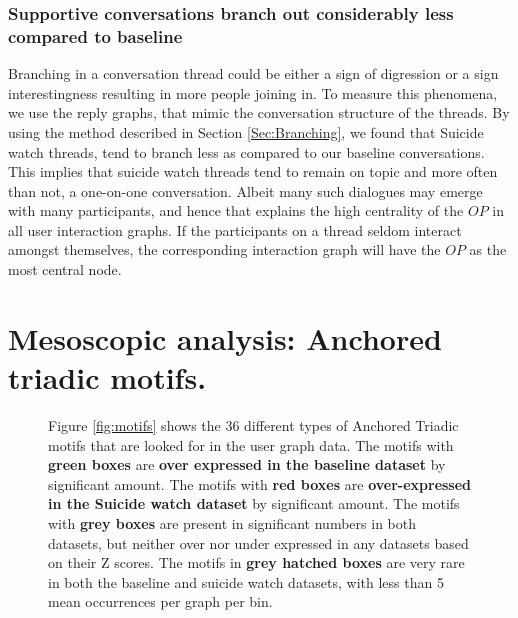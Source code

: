 \subsubsection{Supportive conversations branch out considerably less compared to baseline}
Branching in a conversation thread could be either a sign of digression or a sign interestingness resulting in more people joining in. To measure this phenomena, we use the reply graphs, that mimic the conversation structure of the threads. By using the method described in Section \ref{Sec:Branching}, we found that Suicide watch threads, tend to branch less as compared to our baseline conversations. This implies that suicide watch threads tend to remain on topic and more often than not, a one-on-one conversation. Albeit many such dialogues may emerge with many participants, and hence that explains the high centrality of the $OP$ in all user interaction graphs. If the participants on a thread seldom interact amongst themselves, the corresponding interaction graph will have the $OP$ as the most central node.



\section{Mesoscopic analysis: Anchored triadic motifs. }
\label{Sec:motif}

\begin{figure}[!ht]
    \centering
    
    \caption{ Figure \ref{fig:motifs} shows the 36 different types of Anchored Triadic motifs that are looked for in the user graph data. The motifs with \textbf{green boxes} are \textbf{over expressed in the baseline dataset} by significant amount. The motifs with \textbf{red boxes} are \textbf{over-expressed in the Suicide watch dataset} by significant amount. The motifs with \textbf{grey boxes} are present in significant numbers in both datasets, but neither over nor under expressed in any datasets based on their Z scores. The motifs in \textbf{grey hatched boxes} are very rare in both the baseline and suicide watch datasets, with less than 5 mean occurrences per graph per bin. 
    }
    \label{Fig:motifs}
\end{figure}


